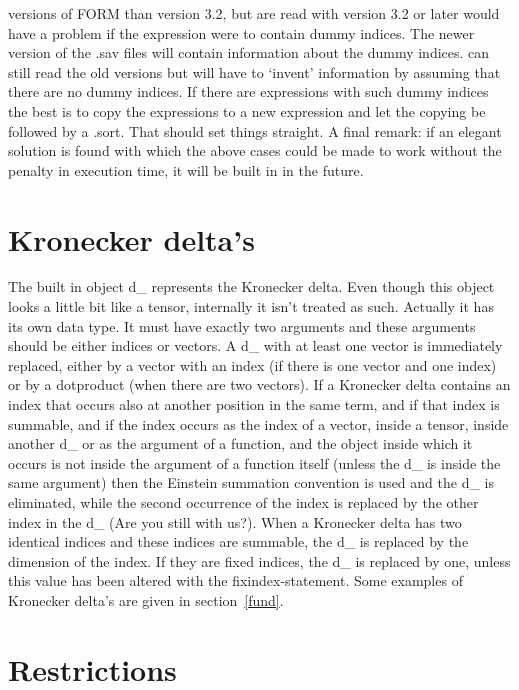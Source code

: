 versions of FORM than version 3.2, but are read with version 3.2 or later 
would have a problem if the expression were to contain dummy indices. The 
newer version of the .sav files will contain information 
about the dummy indices. {\FORM} can still read the old versions but will 
have to `invent' information by assuming that there are no dummy indices. 
If there are expressions with such dummy indices the best is to copy the 
expressions to a new expression and let the copying be followed by a .sort. 
That should set things straight. A final remark: if an elegant solution is 
found with which the above cases could be made to work without the penalty 
in execution time, it will be built in in the future.

\section{Kronecker delta's}

\label{sect-kroneckerdelta}
The built in object d\_ represents the Kronecker 
delta. Even though this 
object looks a little bit like a tensor, internally it isn't treated as 
such. Actually it has its own data type. It must have exactly two arguments 
and these arguments should be either indices or vectors. A d\_ with at 
least one vector is immediately replaced, either by a vector with an index 
(if there is one vector and one index) or by a dotproduct (when there are 
two vectors). If a Kronecker delta contains an index that occurs also at 
another position in the same term, and if that index is summable, and if 
the index occurs as the index of a vector, inside a tensor, inside another 
d\_ or as the argument of a function, and the object inside which it occurs 
is not inside the argument of a function itself (unless the d\_ is inside 
the same argument) then the Einstein 
summation convention is used and the 
d\_ is eliminated, while the second occurrence of the index is replaced by 
the other index in the d\_ (Are you still with us?). When a 
Kronecker delta has two identical indices and these indices are summable, 
the d\_ is replaced by the dimension of the index. If they are fixed 
indices, the d\_ is replaced by one, unless this value has been altered 
with the fixindex-statement. Some examples of Kronecker delta's are given 
in section~\ref{fund}.

\section{Restrictions}

